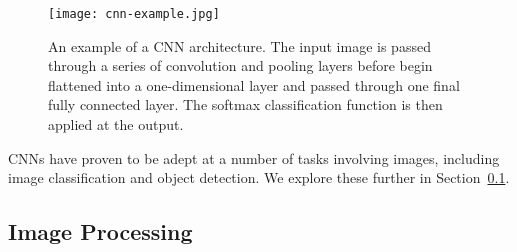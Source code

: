 \documentclass[../interim.tex]{subfiles}
\begin{document}
\begin{figure}
  \centering
  \texttt{[image: cnn-example.jpg]}
  \label{fig:example-cnn}
  \caption{An example of a CNN architecture. The input image is passed through a series of convolution and pooling layers before begin flattened into a one-dimensional layer and passed through one final fully connected layer. The softmax classification function is then applied at the output.}
\end{figure}

CNNs have proven to be adept at a number of tasks involving images, including image classification\cite{cnn-uses:classification} and object detection\cite{cnn-uses:yolo-v3}\cite{cnn-uses:faster-r-cnn}. We explore these further in Section~\ref{section:image-proc}.


\subsection{Image Processing}
\label{section:image-proc}
\end{document}
